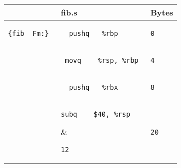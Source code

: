 \documentclass{ti2}
\begin{document}
\begin{tabular}{ | l | l | l|} \hline
  &  fib.s & Bytes\\ \hline
\begin{lstlisting}
{fib__Fm:} 
\end{lstlisting} &
\begin{lstlisting}
  pushq   %rbp 
\end{lstlisting} &
\begin{lstlisting}
0
\end{lstlisting} \\ \hline

\begin{lstlisting}
\end{lstlisting} &
\begin{lstlisting}
 movq    %rsp, %rbp 
\end{lstlisting} &
\begin{lstlisting}
4
\end{lstlisting} \\ \hline

\begin{lstlisting}
\end{lstlisting} &
\begin{lstlisting}
  pushq   %rbx
\end{lstlisting} &
\begin{lstlisting}
8
\end{lstlisting} \\ \hline

\begin{lstlisting}
\end{lstlisting} &
\begin{lstlisting}
subq    $40, %rsp
\end{lstlisting} &
\begin{lstlisting}
12
\end{lstlisting} \\ \hline

\begin{lstlisting}
\end{lstlisting} &
\begin{lstlisting}
 movq    %rdi, -40(%rbp)
\end{lstlisting} &
\begin{lstlisting}
16
\end{lstlisting} \\ \hline

\begin{lstlisting}
\end{lstlisting} &
\begin{lstlisting}
 movq    $1, -24(%rbp)
\end{lstlisting} &
\begin{lstlisting}
20
\end{lstlisting} \\ \hline


\end{tabular}
\end{document}
